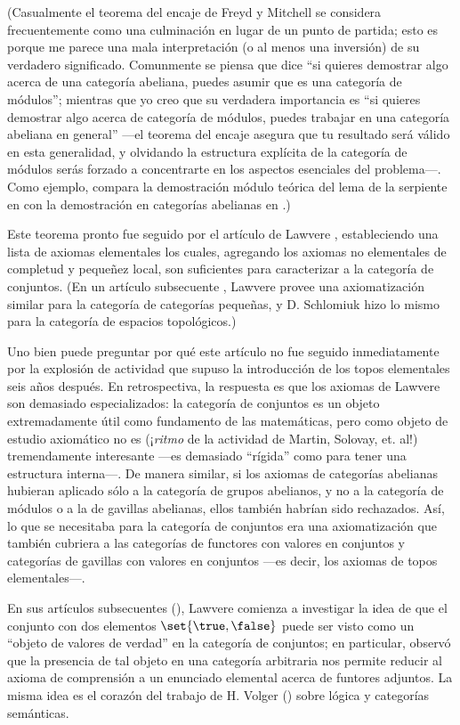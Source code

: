 (Casualmente el teorema del encaje de Freyd y Mitchell se considera
frecuentemente como una culminación en lugar de un punto de partida; esto es
porque me parece una mala interpretación (o al menos una inversión) de su
verdadero significado. Comunmente se piensa que dice \enquote{si quieres
demostrar algo acerca de una categoría abeliana, puedes asumir que es una
categoría de módulos}; mientras que yo creo que su verdadera importancia es
\enquote{si quieres demostrar algo acerca de categoría de módulos, puedes
trabajar en una categoría abeliana en general} ---el teorema del encaje asegura
que tu resultado será válido en esta generalidad, y olvidando la estructura
explícita de la categoría de módulos serás forzado a concentrarte en los
aspectos esenciales del problema---. Como ejemplo, compara la demostración
módulo teórica del lema de la serpiente en  con la demostración en
categorías abelianas en \pend{[CW]}.)

Este teorema pronto fue seguido por el artículo de Lawvere \pend{[71]},
estableciendo una lista de axiomas elementales los cuales, agregando los axiomas
no elementales de completud y pequeñez local, son suficientes para caracterizar
a la categoría de conjuntos. (En un artículo subsecuente \pend{[72]}, Lawvere
provee una axiomatización similar para la categoría de categorías pequeñas, y D.
Schlomiuk \pend{[105]} hizo lo mismo para la categoría de espacios topológicos.)

Uno bien puede preguntar por qué este artículo no fue seguido inmediatamente por
la explosión de actividad que supuso la introducción de los topos elementales
seis años después. En retrospectiva, la respuesta es que los axiomas de Lawvere
son demasiado especializados: la categoría de conjuntos es un objeto
extremadamente útil como fundamento de las matemáticas, pero como objeto de
estudio axiomático no es (¡\textit{ritmo} de la actividad de Martin, Solovay, et.
al!) tremendamente interesante ---es demasiado \enquote{rígida} como para tener
una estructura interna---. De manera similar, si los axiomas de categorías
abelianas hubieran aplicado sólo a la categoría de grupos abelianos, y no a la
categoría de módulos o a la de gavillas abelianas, ellos también habrían sido
rechazados. Así, lo que se necesitaba para la categoría de conjuntos era una
axiomatización que también cubriera a las categorías de functores con valores en
conjuntos y categorías de gavillas con valores en conjuntos ---es decir, los
axiomas de topos elementales---.

En sus artículos subsecuentes (), Lawvere comienza a
investigar la idea de que el conjunto con dos elementos \(\set{\true, \false}\)
puede ser visto como un \enquote{objeto de valores de verdad} en la categoría de
conjuntos; en particular, observó que la presencia de tal objeto en una
categoría arbitraria nos permite reducir al axioma de comprensión a un enunciado
elemental acerca de funtores adjuntos. La misma idea es el corazón del trabajo
de H. Volger () sobre lógica y categorías semánticas.

